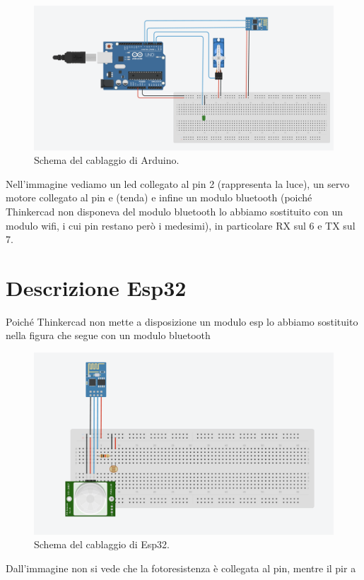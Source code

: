 \documentclass[a4paper,12pt]{report}
\begin{document}
\begin{figure}[H]
\centering
\includegraphics[width=\textwidth]{img/wire-arduino.png}
\caption{Schema del cablaggio di Arduino.}
\label{fig:wiringsarduino}
\end{figure}

Nell'immagine vediamo un led collegato al pin 2 (rappresenta la luce), un servo motore collegato al pin e (tenda) e infine un modulo bluetooth (poiché Thinkercad non disponeva del modulo bluetooth lo abbiamo sostituito con un modulo wifi, i cui pin restano però i medesimi), in particolare RX sul 6 e TX sul 7.

\section{Descrizione Esp32}
Poiché Thinkercad non mette a disposizione un modulo esp lo abbiamo sostituito nella figura che segue con un modulo bluetooth 

\begin{figure}[H]
\centering
\includegraphics[width=\textwidth]{img/wire-esp.png}
\caption{Schema del cablaggio di Esp32.}
\label{fig:wiringsesp}
\end{figure}

Dall'immagine non si vede che la fotoresistenza è collegata al pin, mentre il pir a 
\end{document}
